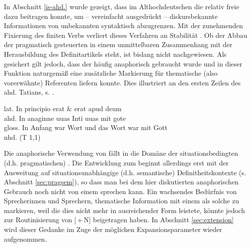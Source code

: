 In Abschnitt \ref{is-ahd.} wurde gezeigt, dass im Althochdeutschen die relativ freie  dazu beitragen konnte, um -- vereinfacht ausgedrückt -- diskursbekannte Informationen von unbekannten syntaktisch abzugrenzen. Mit der zunehmenden Fixierung des finiten Verbs verliert dieses Verfahren an Stabilität \parencite{Hinterholzl2010}. Ob der Abbau der pragmatisch gesteuerten  in einem unmittelbaren Zusammenhang mit der Herausbildung des Definitartikels  steht, ist bislang nicht nachgewiesen. Als gesichert gilt jedoch, dass der  häufig anaphorisch  gebraucht wurde \parencite{Jager1918, Oubouzar1992} und in dieser Funktion naturgemäß eine zusätzliche Markierung für thematische  (also vorerwähnte) Referenten liefern konnte. Dies illustriert \textcite[161]{Leiss2000} an den ersten Zeilen des ahd. Tatians, s. .

\begin{exe} 
\ex \label{ex:wort} 
\glll lat.  In principio erat  \& {}  erat apud deum\\
	ahd. In anaginne uuas  Inti   uuas mit gote \\
	gloss. In Anfang war Wort und das Wort war mit Gott \\
	\trans nhd.   (T 1,1)
	\end{exe}

\noindent
Die anaphorische  Verwendung von  fällt in die Domäne der situationsbedingten (d.h. pragmatischen) 
 . Die Entwicklung zum  beginnt allerdings erst mit der Ausweitung auf situationsunabhängige (d.h. semantische) Definitheitskontexte (s. Abschnitt \ref{sec:pragsem}), so dass man bei dem hier diskutierten anaphorischen 
 Gebrauch noch nicht von einem  sprechen kann. Ein wachsendes Bedürfnis von Sprecherinnen und Sprechern, thematische Information mit einem  als solche zu markieren, weil die  dies nicht mehr in ausreichender Form leistete, könnte jedoch zur Routinisierung von [\,+\,N] beigetragen haben. In Abschnitt \ref{sec:extension} wird dieser Gedanke im Zuge der möglichen Expansionsparameter wieder aufgenommen.\largerpage

